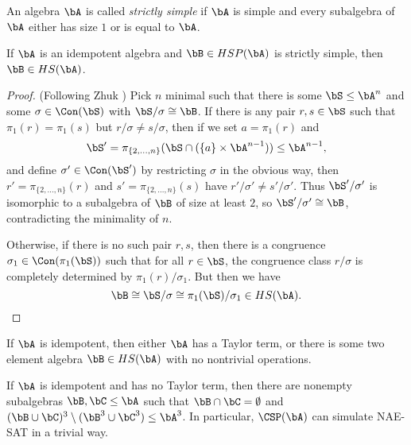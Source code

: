 \begin{defn} An algebra $\bA$ is called \emph{strictly simple} if $\bA$ is simple and every subalgebra of $\bA$ either has size $1$ or is equal to $\bA$.
\end{defn}

\begin{lem}\label{strictly-simple-hs} If $\bA$ is an idempotent algebra and $\bB \in HSP(\bA)$ is strictly simple, then $\bB \in HS(\bA)$.
\end{lem}
\begin{proof} (Following Zhuk \cite{zhuk-strong}) Pick $n$ minimal such that there is some $\bS \le \bA^n$ and some $\sigma \in \Con(\bS)$ with $\bS/\sigma \cong \bB$. If there is any pair $r,s \in \bS$ such that $\pi_1(r) = \pi_1(s)$ but $r/\sigma \ne s/\sigma$, then if we set $a = \pi_1(r)$ and
\[
\bS' = \pi_{\{2, ..., n\}}(\bS \cap (\{a\} \times \bA^{n-1})) \le \bA^{n-1},
\]
and define $\sigma' \in \Con(\bS')$ by restricting $\sigma$ in the obvious way, then $r' = \pi_{\{2, ..., n\}}(r)$ and $s' = \pi_{\{2, ..., n\}}(s)$ have $r'/\sigma' \ne s'/\sigma'$. Thus $\bS'/\sigma'$ is isomorphic to a subalgebra of $\bB$ of size at least $2$, so $\bS'/\sigma' \cong \bB$, contradicting the minimality of $n$.

Otherwise, if there is no such pair $r,s$, then there is a congruence $\sigma_1 \in \Con(\pi_1(\bS))$ such that for all $r \in \bS$, the congruence class $r/\sigma$ is completely determined by $\pi_1(r)/\sigma_1$. But then we have
\[
\bB \cong \bS/\sigma \cong \pi_1(\bS)/\sigma_1 \in HS(\bA).\qedhere
\]
\end{proof}

\begin{cor} If $\bA$ is idempotent, then either $\bA$ has a Taylor term, or there is some two element algebra $\bB \in HS(\bA)$ with no nontrivial operations.
\end{cor}

\begin{cor} If $\bA$ is idempotent and has no Taylor term, then there are nonempty subalgebras $\bB, \bC \le \bA$ such that $\bB \cap \bC = \emptyset$ and $(\bB \cup \bC)^3 \setminus (\bB^3 \cup \bC^3) \le \bA^3$. In particular, $\CSP(\bA)$ can simulate NAE-SAT in a trivial way.
\end{cor}

